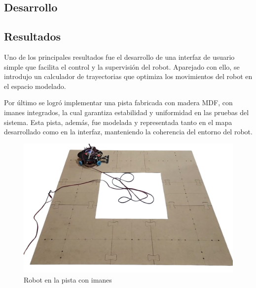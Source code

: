\subsection{Desarrollo}











\subsection{Resultados}
Uno de los principales resultados fue el desarrollo de una interfaz de usuario simple que facilita el control y la supervisión del robot. Aparejado con ello, se introdujo un calculador de trayectorias que optimiza los movimientos del robot en el espacio modelado.

Por último se logró implementar una pista fabricada con madera MDF, con imanes integrados, la cual garantiza estabilidad y uniformidad en las pruebas del sistema. Esta pista, además, fue modelada y representada tanto en el mapa desarrollado como en la interfaz, manteniendo la coherencia del entorno del robot.


\begin{figure}[H]
    \centering
    \includegraphics[width=1\linewidth]{images/robot_en_pista_final.png}
    \caption{Robot en la pista con imanes}
    \label{fig:robotpistaconimanes}
\end{figure}

